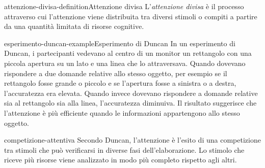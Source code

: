 \documentclass[preview]{standalone}
\begin{document}
\begin{snippetdefinition}{attenzione-divisa-definition}{Attenzione divisa}
    L'\emph{attenzione divisa} è il processo attraverso cui l'attenzione viene
    distribuita tra diversi stimoli o compiti a partire da una quantità limitata
    di risorse cognitive.
\end{snippetdefinition}

\begin{snippetexample}{esperimento-duncan-example}{Esperimento di Duncan}
    In un esperimento di Duncan, i partecipanti vedevano al centro di un monitor
    un rettangolo con una piccola apertura su un lato e una linea che lo
    attraversava. Quando dovevano rispondere a due domande relative allo stesso
    oggetto, per esempio se il rettangolo fosse grande o piccolo e se
    l'apertura fosse a sinistra o a destra, l'accuratezza era elevata. Quando
    invece dovevano rispondere a domande relative sia al rettangolo sia alla
    linea, l'accuratezza diminuiva. Il risultato suggerisce che l'attenzione è
    più efficiente quando le informazioni appartengono allo stesso oggetto.
\end{snippetexample}


\begin{snippet}{competizione-attentiva}
    Secondo Duncan, l'attenzione è l'esito di una competizione tra stimoli che
    può verificarsi in diverse fasi dell'elaborazione. Lo stimolo che riceve
    più risorse viene analizzato in modo più completo rispetto agli altri.
\end{snippet}
\end{document}
